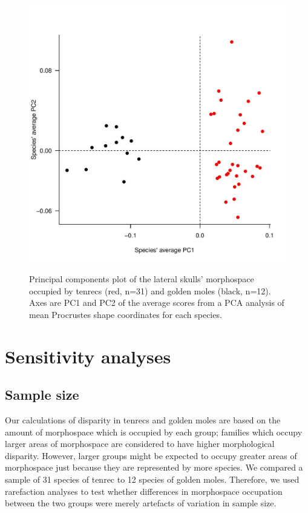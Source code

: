 \documentclass[12pt,a4paper]{article}
\begin{document}
\begin{figure}[H]
\centering
\includegraphics[width=12cm, height=12cm, keepaspectratio=true]
{figures/skvent_tenrec+gmole_PCA.jpg}
\caption{Principal components plot of the lateral skulls' morphospace occupied by tenrecs (red, n=31) and golden moles (black, n=12). Axes are PC1 and PC2 of the average scores from a PCA analysis of mean Procrustes shape coordinates for each species. }
\label{fig:skventPCA}
\end{figure}


\section{Sensitivity analyses}
\subsection{Sample size}

Our calculations of disparity in tenrecs and golden moles are based on the amount of morphospace which is occupied by each group; families which occupy larger areas of morphospace are considered to have higher morphological disparity. However, larger groups might be expected to occupy greater areas of morphospace just because they are represented by more species. We compared a sample of 31 species of tenrec to 12 species of golden moles. Therefore, we used rarefaction analyses to test whether differences in morphospace occupation between the two groups were merely artefacts of variation in sample size.
\end{document}

